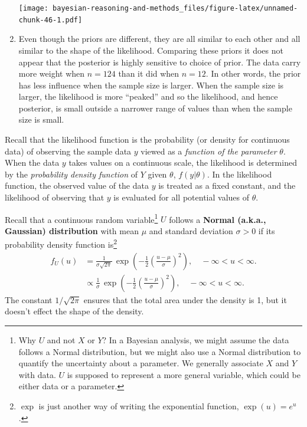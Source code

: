 \documentclass[
]{book}
\theoremstyle{definition}
\theoremstyle{definition}
\theoremstyle{definition}
\theoremstyle{remark}
\begin{document}
\begin{enumerate}
  \texttt{[image: bayesian-reasoning-and-methods\_files/figure-latex/unnamed-chunk-46-1.pdf]}
\item
  Even though the priors are different, they are all similar to each other and all similar to the shape of the likelihood. Comparing these priors it does not appear that the posterior is highly sensitive to choice of prior. The data carry more weight when \(n=124\) than it did when \(n=12\). In other words, the prior has less influence when the sample size is larger. When the sample size is larger, the likelihood is more ``peaked'' and so the likelihood, and hence posterior, is small outside a narrower range of values than when the sample size is small.
\end{enumerate}

Recall that the likelihood function is the probability (or density for continuous data) of observing the sample data \(y\) viewed as a \emph{function of the parameter} \(\theta\).
When the data \(y\) takes values on a continuous scale, the likelihood is determined by the \emph{probability density function} of \(Y\) given \(\theta\), \(f(y|\theta)\).
In the likelihood function, the observed value of the data \(y\) is treated as a fixed constant, and the likelihood of observing that \(y\) is evaluated for all potential values of \(\theta\).

Recall that a continuous random variable\footnote{Why \(U\) and not \(X\) or \(Y\)? In a Bayesian analysis, we might assume the data follows a Normal distribution, but we might also use a Normal distribution to quantify the uncertainty about a parameter. We generally associate \(X\) and \(Y\) with data. \(U\) is supposed to represent a more general variable, which could be either data or a parameter.} \(U\) follows a \textbf{Normal (a.k.a., Gaussian) distribution} with mean \(\mu\) and standard deviation \(\sigma>0\) if its probability density function is\footnote{\(\exp\) is just another way of writing the exponential function, \(\exp(u)=e^u\).}
\begin{align*}
f_U(u) & = \frac{1}{\sigma\sqrt{2\pi}}\,\exp\left(-\frac{1}{2}\left(\frac{u-\mu}{\sigma}\right)^2\right), \quad -\infty<u<\infty.\\
& \propto \frac{1}{\sigma}\,\exp\left(-\frac{1}{2}\left(\frac{u-\mu}{\sigma}\right)^2\right), \quad -\infty<u<\infty.
\end{align*}
The constant \(1/\sqrt{2\pi}\) ensures that the total area under the density is 1, but it doesn't effect the shape of the density.
\end{document}
